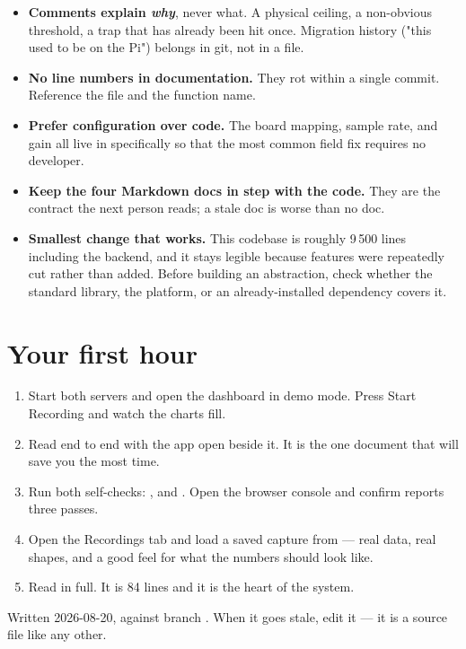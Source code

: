 \documentclass[11pt,a4paper]{article}
\begin{document}
\begin{itemize}
  \item \textbf{Comments explain \emph{why}}, never what. A physical ceiling, a
        non-obvious threshold, a trap that has already been hit once. Migration
        history ("this used to be on the Pi") belongs in git, not in a file.
  \item \textbf{No line numbers in documentation.} They rot within a single
        commit. Reference the file and the function name.
  \item \textbf{Prefer configuration over code.} The board mapping, sample rate,
        and gain all live in  specifically so that
        the most common field fix requires no developer.
  \item \textbf{Keep the four Markdown docs in step with the code.} They are the
        contract the next person reads; a stale doc is worse than no doc.
  \item \textbf{Smallest change that works.} This codebase is roughly 9\,500
        lines including the backend, and it stays legible because features were
        repeatedly cut rather than added. Before building an abstraction, check
        whether the standard library, the platform, or an already-installed
        dependency covers it.
\end{itemize}

\section{Your first hour}

\begin{enumerate}
  \item Start both servers and open the dashboard in demo mode. Press
        \textsf{Start Recording} and watch the charts fill.
  \item Read  end to end with the app open beside
        it. It is the one document that will save you the most time.
  \item Run both self-checks: , and
        . Open the browser console and
        confirm  reports three passes.
  \item Open the Recordings tab and load a saved capture from
         --- real data, real shapes, and a good
        feel for what the numbers should look like.
  \item Read  in full. It is 84 lines and it is the heart
        of the system.
\end{enumerate}

\vspace{4pt}
{\color{muted}\small Written 2026-08-20, against branch .
When it goes stale, edit it --- it is a source file like any other.}
\end{document}
